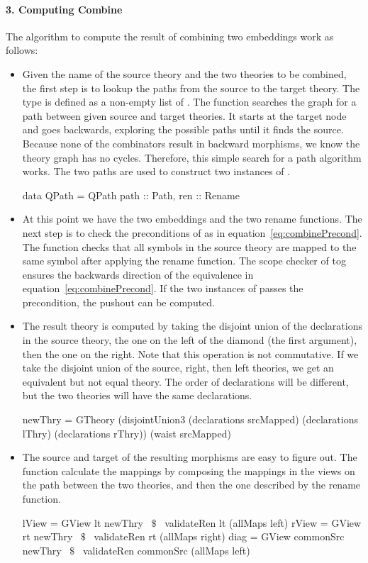 \paragraph{3. Computing Combine}
The algorithm to compute the result of combining two embeddings work as follows:  
\begin{itemize}
    \item Given the name of the source theory and the two theories to be combined, the first step is to lookup the paths from the source to the target theory. The type  is defined as a non-empty list of . The function  searches the graph for a path between given source and target theories. It starts at the target node and goes backwards, exploring the possible paths until it finds the source. Because none of the combinators result in backward morphisms, we know the theory graph has no cycles. Therefore, this simple search for a path algorithm works. The two paths are used to construct two instances of . 
\begin{hscode}
data QPath = QPath { 
  path :: Path,
  ren  :: Rename }
\end{hscode}

    \item At this point we have the two embeddings and the two rename functions. The next step is to check the preconditions of  as in equation~\ref{eq:combinePrecond}. The function  checks that all symbols in the source theory are mapped to the same symbol after applying the rename function. The scope checker of tog ensures the backwards direction of the equivalence in equation~\ref{eq:combinePrecond}. If the two instances of  passes the precondition, the pushout can be computed.
    
    \item The result theory is computed by taking the disjoint union of the declarations in the source theory, the one on the left of the diamond (the first argument), then the one on the right. Note that this operation is not commutative. If we take the disjoint union of the source, right, then left theories, we get an equivalent but not equal theory. The order of declarations will be different, but the two theories will have the same declarations. 
\begin{hscode}
 newThry = 
   GTheory (disjointUnion3 (declarations srcMapped)
                           (declarations lThry) 
                           (declarations rThry)) 
           (waist srcMapped)
\end{hscode}    
    \item The source and target of the resulting morphisms are easy to figure out. The function  calculate the mappings by composing the mappings in the views on the path between the two theories, and then the one described by the rename function. 
\begin{hscode}
lView = GView lt newThry ~$\$$~ validateRen lt (allMaps left)
rView = GView rt newThry ~$\$$~ validateRen rt (allMaps right)
diag  = 
  GView commonSrc newThry ~$\$$~ validateRen commonSrc (allMaps left)
\end{hscode}
\end{itemize}

